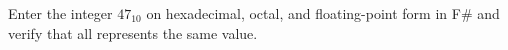 Enter the integer $47_{10}$ on hexadecimal, octal, and floating-point form in F\# and verify that all represents the same value.